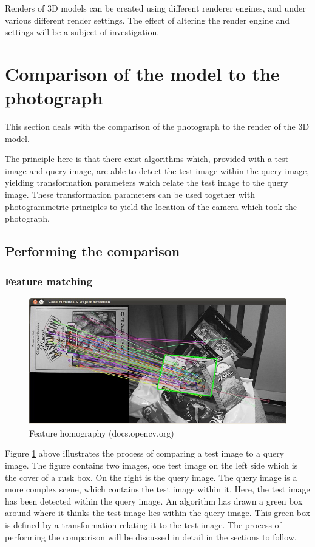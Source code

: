 \documentclass[11pt,a4paper]{report}
\begin{document}
			Renders of 3D models can be created using different renderer engines, and under various different render settings. The effect of altering the render engine and settings will be a subject of investigation.
			
	\section{Comparison of the model to the photograph}
		This section deals with the comparison of the photograph to the render of the 3D model.
		
		The principle here is that there exist algorithms which, provided with a test image and query image, are able to detect the test image within the query image, yielding transformation parameters which relate the test image to the query image. These transformation parameters can be used together with photogrammetric principles to yield the location of the camera which took the photograph.
		
		\subsection{Performing the comparison}
			\subsubsection{Feature matching}
				\begin{figure}[H]
					\centering
					\includegraphics[width=1\textwidth]{feature_homography_example}
					\caption[Feature homography]{Feature homography (docs.opencv.org)}
					\label{fig:feature_homogrophy}
				\end{figure}
				
				Figure \ref{fig:feature_homogrophy} above illustrates the process of comparing a test image to a query image. The figure contains two images, one test image on the left side which is the cover of a rusk box. On the right is the query image. The query image is a more complex scene, which contains the test image within it. Here, the test image has been detected within the query image. An algorithm has drawn a green box around where it thinks the test image lies within the query image. This green box is defined by a transformation relating it to the test image. The process of performing the comparison will be discussed in detail in the sections to follow.
			
\end{document}
